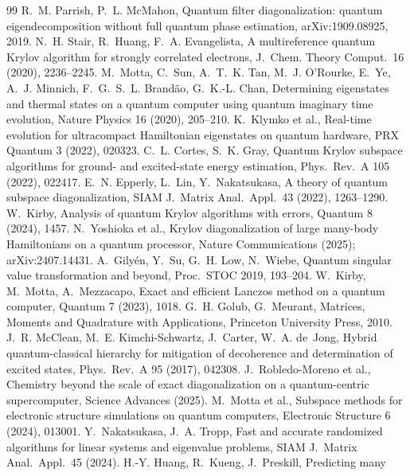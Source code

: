\documentclass[11pt,a4paper]{article}
\begin{document}
\small
\begin{thebibliography}{99}
 R.~M. Parrish, P.~L. McMahon, Quantum filter diagonalization:
  quantum eigendecomposition without full quantum phase estimation,
  arXiv:1909.08925, 2019.
 N.~H. Stair, R.~Huang, F.~A. Evangelista, A multireference
  quantum Krylov algorithm for strongly correlated electrons,
  J.~Chem. Theory Comput.\ 16 (2020), 2236--2245.
 M.~Motta, C.~Sun, A.~T.~K. Tan, M.~J. O'Rourke, E.~Ye,
  A.~J. Minnich, F.~G.~S.~L. Brand\~ao, G.~K.-L. Chan, Determining eigenstates
  and thermal states on a quantum computer using quantum imaginary time
  evolution, Nature Physics 16 (2020), 205--210.
 K.~Klymko et al., Real-time evolution for ultracompact
  Hamiltonian eigenstates on quantum hardware, PRX Quantum 3 (2022), 020323.
 C.~L. Cortes, S.~K. Gray, Quantum Krylov subspace algorithms
  for ground- and excited-state energy estimation, Phys.\ Rev.\ A 105 (2022),
  022417.
 E.~N. Epperly, L.~Lin, Y.~Nakatsukasa, A theory of quantum
  subspace diagonalization, SIAM J.\ Matrix Anal.\ Appl.\ 43 (2022),
  1263--1290.
 W.~Kirby, Analysis of quantum Krylov algorithms with
  errors, Quantum 8 (2024), 1457.
 N.~Yoshioka et al., Krylov diagonalization of large
  many-body Hamiltonians on a quantum processor, Nature Communications (2025);
  arXiv:2407.14431.
 A.~Gily\'en, Y.~Su, G.~H. Low, N.~Wiebe, Quantum singular
  value transformation and beyond, Proc.\ STOC 2019, 193--204.
 W.~Kirby, M.~Motta, A.~Mezzacapo, Exact and efficient
  Lanczos method on a quantum computer, Quantum 7 (2023), 1018.
 G.~H. Golub, G.~Meurant, Matrices, Moments and Quadrature
  with Applications, Princeton University Press, 2010.
 J.~R. McClean, M.~E. Kimchi-Schwartz, J.~Carter,
  W.~A. de~Jong, Hybrid quantum-classical hierarchy for mitigation of
  decoherence and determination of excited states, Phys.\ Rev.\ A 95 (2017),
  042308.
 J.~Robledo-Moreno et al., Chemistry beyond the scale of exact
  diagonalization on a quantum-centric supercomputer, Science Advances (2025).
 M.~Motta et al., Subspace methods for electronic structure
  simulations on quantum computers, Electronic Structure 6 (2024), 013001.
 Y.~Nakatsukasa, J.~A. Tropp, Fast and accurate randomized
  algorithms for linear systems and eigenvalue problems, SIAM J.\ Matrix
  Anal.\ Appl.\ 45 (2024).
 H.-Y. Huang, R.~Kueng, J.~Preskill, Predicting many

\end{thebibliography}
\end{document}
